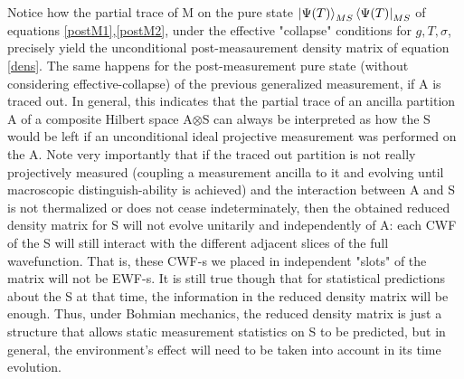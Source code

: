 \documentclass[11pt, a4paper]{article} %
\begin{document}
Notice how the partial trace of M on the pure state $\ket{\Psi(T)}_{MS}\bra{\Psi(T)}_{MS}$ of equations \eqref{postM1},\eqref{postM2}, under the effective "collapse" conditions for $g,T,\sigma$, precisely yield the unconditional post-measaurement density matrix of equation \eqref{dens}. The same happens for the post-measurement pure state (without considering effective-collapse) of the previous generalized measurement, if A is traced out. In general, this indicates that the partial trace of an ancilla partition A of a composite Hilbert space A$\otimes$S can always be interpreted as how the S would be left if an unconditional ideal projective measurement was performed on the A. Note very importantly that if the traced out partition is not really projectively measured (coupling a measurement ancilla to it and evolving until macroscopic distinguish-ability is achieved) and the interaction between A and S is not thermalized or does not cease indeterminately, then the obtained reduced density matrix for S will not evolve unitarily and independently of A: each CWF of the S will still interact with the different adjacent slices of the full wavefunction. That is, these CWF-s we placed in independent "slots" of the matrix will not be EWF-s. It is still true though that for statistical predictions about the S at that time, the information in the reduced density matrix will be enough. Thus, under Bohmian mechanics, the reduced density matrix is just a structure that allows static measurement statistics on S to be predicted, but in general, the environment's effect will need to be taken into account in its time evolution. %
\end{document}
